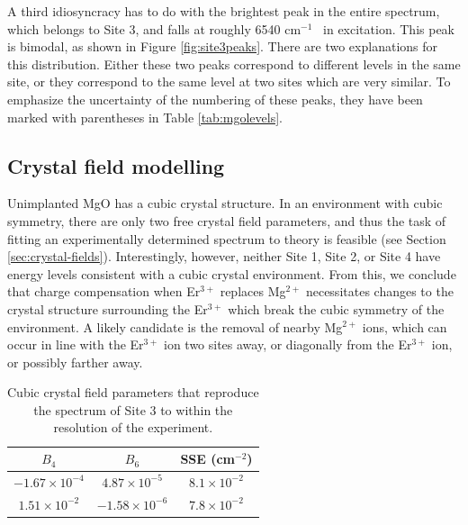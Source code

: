 \documentclass[12pt]{report}
\newcommand{\erbium}[1][ ]{Er$^{3+}$#1}
\newcommand{\wn}[1][ ]{cm$^{-1}$#1}
\begin{document}
A third idiosyncracy has to do with the brightest peak in the entire spectrum, which belongs to Site 3, and falls at roughly 6540 \wn\ in excitation. This peak is bimodal, as shown in Figure \ref{fig:site3peaks}. There are two explanations for this distribution. Either these two peaks correspond to different levels in the same site, or they correspond to the same level at two sites which are very similar. To emphasize the uncertainty of the numbering of these peaks, they have been marked with parentheses in Table \ref{tab:mgolevels}.

\subsection{Crystal field modelling}
Unimplanted MgO has a cubic crystal structure. In an environment with cubic symmetry, there are only two free crystal field parameters, and thus the task of fitting an experimentally determined spectrum to theory is feasible (see Section \ref{sec:crystal-fields}). Interestingly, however, neither Site 1, Site 2, or Site 4 have energy levels consistent with a cubic crystal environment. From this, we conclude that charge compensation when \erbium replaces Mg$^{2+}$ necessitates changes to the crystal structure surrounding the \erbium which break the cubic symmetry of the environment. A likely candidate is the removal of nearby Mg$^{2+}$ ions, which can occur in line with the \erbium ion two sites away, or diagonally from the \erbium ion, or possibly farther away.

\begin{table}
  \centering
  \begin{tabular}{| c | c | c |}
    \hline
    $B_{4}$ & $B_{6}$ & SSE (cm$^{-2}$) \\
    \hline
    $-1.67\times 10^{-4}$ & $4.87\times 10^{-5}$ & $8.1\times 10^{-2}$ \\
    $1.51\times 10^{-2}$ & $-1.58\times 10^{-6}$ & $7.8\times 10^{-2}$\\
    \hline
  \end{tabular}
  \caption{Cubic crystal field parameters that reproduce the spectrum of Site 3 to within the resolution of the experiment.}
  \label{tab:crystalfieldparams}
\end{table}
\end{document}
